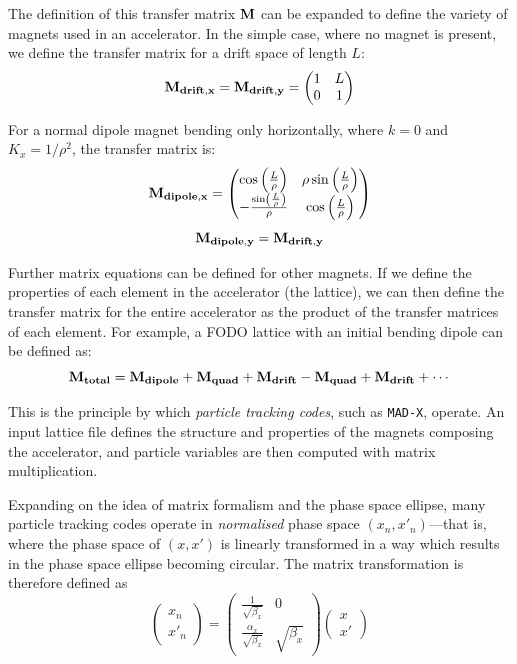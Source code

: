 \documentclass[11pt]{report}
\begin{document}
The definition of this transfer matrix $\bf M$ can be expanded to define the variety of magnets used in an accelerator. In the simple case, where no magnet is present, we define the transfer matrix for a drift space of length $L$:
\begin{equation}
  \bf{M}_{drift,x}=\bf{M}_{drift,y}=
  \begin{pmatrix}
    1 & L \\
    0 & 1
  \end{pmatrix}
\end{equation}

For a normal dipole magnet bending only horizontally, where $k=0$ and $K_x=1/\rho^2$, the transfer matrix is:
\begin{equation}
  \bf{M}_{dipole,x}=
  \begin{pmatrix}
    \cos\left(\frac L\rho\right) & \rho\sin\left(\frac L\rho\right) \\
    -\frac{\sin\left(\frac L\rho\right)}{\rho} & \cos\left(\frac L\rho\right)
  \end{pmatrix}
\end{equation}
\begin{equation}
  \bf{M}_{dipole,y}=\bf{M}_{drift,y}
\end{equation}

Further matrix equations can be defined for other magnets. If we define the properties of each element in the accelerator (the lattice), we can then define the transfer matrix for the entire accelerator as the product of the transfer matrices of each element. For example, a FODO lattice with an initial bending dipole can be defined as:
\begin{equation}
  \bf{M}_{total} = \bf{M}_{dipole} + \bf{M}_{quad} + \bf{M}_{drift} - \bf{M}_{quad} + \bf{M}_{drift} +\cdots
\end{equation}

This is the principle by which \textit{particle tracking codes}, such as \verb|MAD-X|, operate. An input lattice file defines the structure and properties of the magnets composing the accelerator, and particle variables are then computed with matrix multiplication. 

Expanding on the idea of matrix formalism and the phase space ellipse, many particle tracking codes operate in \textit{normalised} phase space $(x_n, x'_n)$---that is, where the phase space of $(x, x')$ is linearly transformed in a way which results in the phase space ellipse becoming circular. The matrix transformation is therefore defined as
\begin{equation}
  \begin{pmatrix}
    x_n \\
    x'_n
  \end{pmatrix} = 
  \begin{pmatrix}
    \frac{1}{\sqrt{\beta_x}} & 0 \\
    \frac{\alpha_x}{\sqrt{\beta_x}} & \sqrt{\beta_x}
  \end{pmatrix} \begin{pmatrix}
    x \\
    x'
  \end{pmatrix}
  \label{eq:normalised}
\end{equation}
\end{document}
